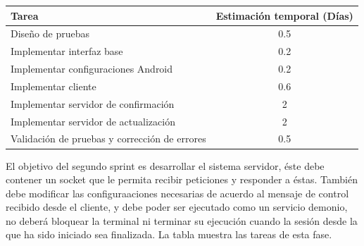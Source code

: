 \documentclass[12pt]{article}
\begin{document}
            \begin{tabular}{|l|c|}
                \hline
                \textbf{Tarea}                                                              &   \textbf{Estimación temporal} (Días) \\           
                \hline
                Diseño de pruebas                                                           &   0.5                                 \\
                Implementar interfaz base                                                   &   0.2                                 \\
                Implementar configuraciones Android                                         &   0.2                                 \\
                Implementar cliente                                                         &   0.6                                 \\
                Implementar servidor de confirmación                                        &   2                                   \\
                Implementar servidor de actualización                                       &   2                                   \\
                Validación de pruebas y corrección de errores                               &   0.5                                 \\
                \hline
            \end{tabular}

            El objetivo del segundo sprint es desarrollar el sistema servidor, éste debe contener un socket que le permita recibir peticiones y responder a éstas. También debe modificar las configuraaciones necesarias de acuerdo al mensaje de control recibido desde el cliente, y debe poder ser ejecutado como un servicio demonio, no deberá bloquear la terminal ni terminar su ejecución cuando la sesión desde la que ha sido iniciado sea finalizada. La tabla  muestra las tareas de esta fase.
\end{document}

